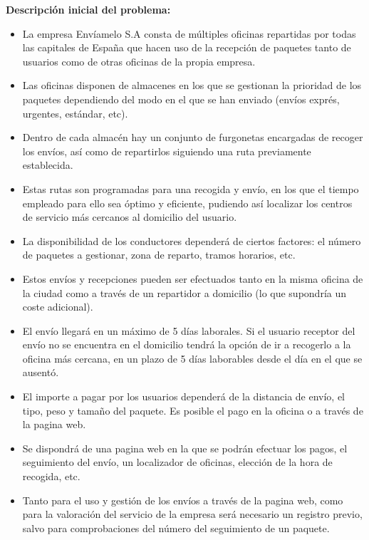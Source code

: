 \documentclass[a4paper, 11pt]{article}
\begin{document}
\setlength{\parindent}{1pt}
\textbf{Descripci\'on inicial del problema:}
\setlength{\parindent}{12pt}
\begin{itemize}
\item La empresa Env\'iamelo S.A consta de m\'ultiples oficinas repartidas por todas las capitales de Espa\~na que hacen uso de la recepci\'on de paquetes tanto de usuarios como de otras oficinas de la propia empresa.
\item Las oficinas disponen de almacenes en los que se gestionan la prioridad de los paquetes dependiendo del modo en el que se han enviado (env\'ios expr\'es, urgentes, est\'andar, etc).
\item Dentro de cada almac\'en hay un conjunto de furgonetas encargadas de recoger los env\'ios, as\'i como de repartirlos siguiendo una ruta previamente establecida.
\item Estas rutas son programadas para una recogida y env\'io, en los que el tiempo empleado para ello sea \'optimo y eficiente, pudiendo as\'i localizar los centros de servicio m\'as cercanos al domicilio del usuario.
\item La disponibilidad de los conductores depender\'a de ciertos factores: el n\'umero de paquetes  a gestionar, zona de reparto, tramos horarios, etc.
\item Estos env\'ios y recepciones pueden ser efectuados tanto en la misma oficina de la ciudad como a trav\'es de un repartidor a domicilio (lo que supondr\'ia un coste adicional).
\item El env\'io llegar\'a en un m\'aximo de 5 d\'ias laborales. Si el usuario receptor del env\'io no se encuentra en el domicilio tendr\'a la opci\'on de ir a recogerlo a la oficina m\'as cercana, en un plazo de 5 d\'ias laborables desde el d\'ia en el que se ausent\'o.
\item El importe a pagar por los usuarios depender\'a de la distancia de env\'io, el tipo, peso y tama\~no del paquete. Es posible el pago en la oficina o a trav\'es de la pagina web. 
\item Se dispondr\'a de una pagina web en la que se podr\'an efectuar los pagos, el seguimiento del env\'io, un localizador de oficinas, elecci\'on de la hora de recogida, etc.
\item Tanto para el uso y gesti\'on de los env\'ios a trav\'es de la pagina web, como para la valoraci\'on del servicio de la empresa ser\'a necesario un registro previo, salvo para comprobaciones del n\'umero del seguimiento de un paquete.
\end{itemize}
\end{document}
